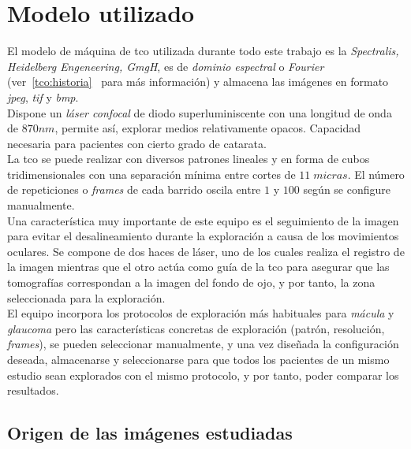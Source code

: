 \section{Modelo utilizado}
El modelo de máquina de \gls{tco} utilizada durante todo este trabajo
es la \emph{Spectralis, Heidelberg Engeneering, GmgH}, es de
\emph{dominio espectral} o \emph{Fourier}
(ver~\ref{tco:historia}~ para más información) y
almacena las imágenes en formato \emph{jpeg},
\emph{tif} y \emph{bmp}.\\
Dispone un \emph{láser confocal} de diodo superluminiscente con una
longitud de onda de $870nm$, permite así, explorar medios
relativamente opacos. Capacidad necesaria para pacientes con cierto
grado de catarata.\\
La \gls{tco} se puede realizar con diversos patrones lineales y en
forma de cubos tridimensionales con una separación mínima entre cortes
de $11\;micras$. El número de repeticiones o \emph{frames} de cada
barrido oscila entre $1$ y $100$ según se configure manualmente.\\
Una característica muy importante de este equipo es el seguimiento de
la imagen para evitar el desalineamiento durante la exploración a
causa de los movimientos oculares. Se compone de dos haces de láser,
uno de los cuales realiza el registro de la imagen mientras que el
otro actúa como guía de la \gls{tco} para asegurar que las tomografías
correspondan a la imagen del fondo de ojo, y por tanto, la zona
seleccionada para la exploración.\\
El equipo incorpora los protocolos de exploración más habituales para
\emph{mácula} y \emph{\gls{glaucoma}} pero las características
concretas de exploración (patrón, resolución, \emph{frames}), se
pueden seleccionar manualmente, y una vez diseñada la configuración
deseada, almacenarse y seleccionarse para que todos los pacientes de
un mismo estudio sean explorados con el mismo protocolo, y por tanto,
poder comparar los resultados.

\subsection{Origen de las imágenes estudiadas}